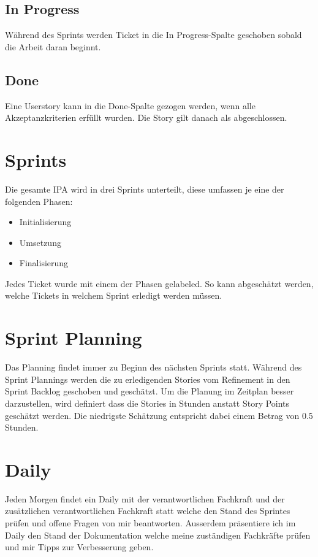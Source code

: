 \subsection{In Progress}
Während des Sprints werden Ticket in die In Progress-Spalte geschoben sobald die Arbeit daran beginnt.

\subsection{Done}
Eine Userstory kann in die Done-Spalte gezogen werden, wenn alle Akzeptanzkriterien erfüllt wurden.
Die Story gilt danach als abgeschlossen.

\section{Sprints}
Die gesamte IPA wird in drei Sprints unterteilt, diese umfassen je eine der folgenden
Phasen:

\begin{itemize}
\item Initialisierung
\item Umsetzung
\item Finalisierung    
\end{itemize}

Jedes Ticket wurde mit einem der Phasen gelabeled. So kann abgeschätzt werden, welche Tickets in welchem
Sprint erledigt werden müssen.

\section{Sprint Planning}
Das Planning findet immer zu Beginn des nächsten Sprints statt. Während des Sprint Plannings werden die zu erledigenden
Stories vom Refinement in den Sprint Backlog geschoben und geschätzt. Um die Planung im Zeitplan
besser darzustellen, wird definiert dass die Stories in Stunden anstatt Story Points geschätzt werden. Die niedrigste Schätzung
entspricht dabei einem Betrag von 0.5 Stunden.

\section{Daily}
Jeden Morgen findet ein Daily mit der verantwortlichen Fachkraft und der zusätzlichen verantwortlichen Fachkraft statt
welche den Stand des Sprintes prüfen und offene Fragen von mir beantworten. Ausserdem präsentiere ich im Daily den Stand der 
Dokumentation welche meine zuständigen Fachkräfte prüfen und mir Tipps zur Verbesserung geben. 

